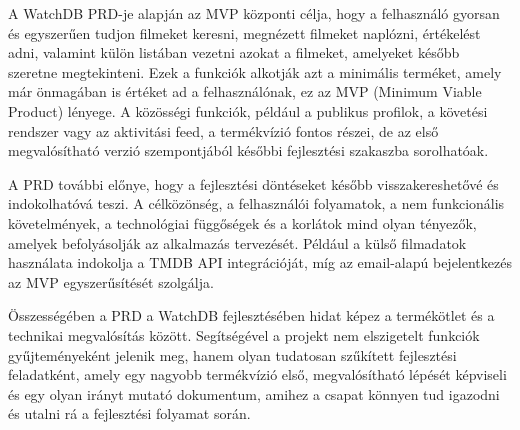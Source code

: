 A WatchDB PRD-je alapján az MVP központi célja, hogy a felhasználó gyorsan és egyszerűen tudjon filmeket keresni, megnézett filmeket naplózni, értékelést adni, valamint külön listában vezetni azokat a filmeket, amelyeket később szeretne megtekinteni. Ezek a funkciók alkotják azt a minimális terméket, amely már önmagában is értéket ad a felhasználónak, ez az MVP (Minimum Viable Product) lényege. A közösségi funkciók, például a publikus profilok, a követési rendszer vagy az aktivitási feed, a termékvízió fontos részei, de az első megvalósítható verzió szempontjából későbbi fejlesztési szakaszba sorolhatóak.

A PRD további előnye, hogy a fejlesztési döntéseket később visszakereshetővé és indokolhatóvá teszi. A célközönség, a felhasználói folyamatok, a nem funkcionális követelmények, a technológiai függőségek és a korlátok mind olyan tényezők, amelyek befolyásolják az alkalmazás tervezését. Például a külső filmadatok használata indokolja a TMDB API integrációját, míg az email-alapú bejelentkezés az MVP egyszerűsítését szolgálja.

Összességében a PRD a WatchDB fejlesztésében hidat képez a termékötlet és a technikai megvalósítás között. Segítségével a projekt nem elszigetelt funkciók gyűjteményeként jelenik meg, hanem olyan tudatosan szűkített fejlesztési feladatként, amely egy nagyobb termékvízió első, megvalósítható lépését képviseli és egy olyan irányt mutató dokumentum, amihez a csapat könnyen tud igazodni és utalni rá a fejlesztési folyamat során.
